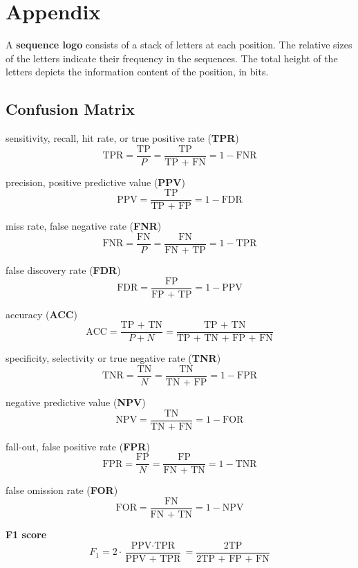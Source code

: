 \documentclass[12pt]{article}
\begin{document}
\section{Appendix}
\par A \textbf{sequence logo} consists of a stack of letters at each position. The relative sizes of the letters indicate their frequency in the sequences. The total height of the letters depicts the information content of the position, in bits.

\subsection{Confusion Matrix}
\begin{small}
\ulb
\item sensitivity, recall, hit rate, or true positive rate (\textbf{TPR})
$$ \text{TPR} = \frac{\text{TP}}{P} = \frac{\text{TP}}{\text{TP + FN}} = 1 - \text{FNR} $$

\item precision, positive predictive value (\textbf{PPV})
$$ \text{PPV} = \frac{\text{TP}}{\text{TP + FP}} = 1 - \text{FDR} $$

\item miss rate, false negative rate (\textbf{FNR})
$$ \text{FNR} = \frac{\text{FN}}{P} = \frac{\text{FN}}{\text{FN + TP}} = 1 - \text{TPR} $$

\item false discovery rate (\textbf{FDR})
$$ \text{FDR} = \frac{\text{FP}}{\text{FP + TP}} = 1 - \text{PPV} $$

\item accuracy (\textbf{ACC})
$$ \text{ACC} = \frac{\text{TP + TN}}{P + N} = \frac{\text{TP + TN}}{\text{TP + TN + FP + FN}} $$

\item specificity, selectivity or true negative rate (\textbf{TNR})
$$ \text{TNR} = \frac{\text{TN}}{N} = \frac{\text{TN}}{\text{TN + FP}} = 1 - \text{FPR} $$

\item negative predictive value (\textbf{NPV})
$$ \text{NPV} = \frac{\text{TN}}{\text{TN + FN}} = 1 - \text{FOR} $$

\item fall-out, false positive rate (\textbf{FPR})
$$ \text{FPR} = \frac{\text{FP}}{N} = \frac{\text{FP}}{\text{FN + TN}} = 1 - \text{TNR} $$

\item false omission rate (\textbf{FOR})
$$ \text{FOR} = \frac{\text{FN}}{\text{FN + TN}} = 1 - \text{NPV} $$

\item \textbf{F1 score}
$$ F_1 = 2 \cdot \frac{\text{PPV} \cdot \text{TPR}}{\text{PPV + TPR}} = \frac{\text{2TP}}{\text{2TP + FP + FN}} $$

\ule
\mce
\end{small}
\end{document}
